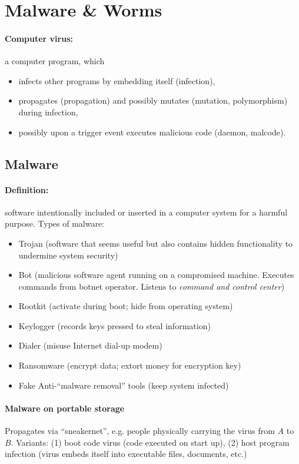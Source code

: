 \section{Malware \& Worms}

\paragraph{Computer virus:} a computer program, which
\begin{itemize}
\item infects other programs by embedding itself (infection),
\item propagates (propagation) and possibly mutates (mutation,
polymorphism) during infection,
\item possibly upon a trigger event executes malicious code
(daemon, malcode).
\end{itemize}

\subsection{Malware}

\paragraph{Definition:} software intentionally included or inserted in a computer system for a harmful purpose. Types of malware:
\begin{itemize}
\item Trojan (software that seems useful but also contains hidden functionality to undermine system security)
\item Bot (malicious software agent running on a compromised machine. Executes commands from botnet operator. Listens to \emph{command and control center})
\item Rootkit (activate during boot; hide from operating system)
\item Keylogger (records keys pressed to steal information)
\item Dialer (misuse Internet dial-up modem)
\item Ransomware (encrypt data; extort money for encryption key) 
\item Fake Anti-``malware removal'' tools (keep system infected)
\end{itemize}

\paragraph{Malware on portable storage} Propagates via ``sneakernet'', e.g. people physically carrying the virus from $A$ to $B$. Variants: (1) boot code virus (code executed on start up), (2) host program infection (virus embeds itself into executable files, documents, etc.)

